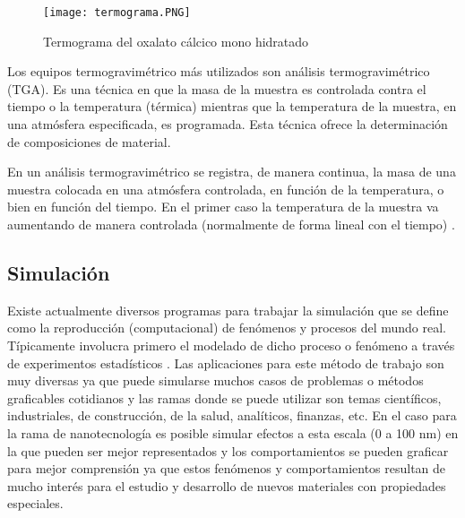 \documentclass[3pt,twocolumn]{elsarticle}
\begin{document}
\begin{figure}[H]
  \centering      
  \texttt{[image: termograma.PNG]}
  \caption{Termograma del oxalato cálcico mono hidratado \cite{book1}}
  \label{f1}
\end{figure}
\bigskip

Los equipos termogravimétrico más utilizados son análisis termogravimétrico (TGA). Es una técnica en que la masa de la muestra es controlada contra el tiempo o la temperatura (térmica) mientras que la temperatura de la muestra, en una atmósfera especificada, es programada. Esta técnica ofrece la determinación de composiciones de material. 

En un análisis termogravimétrico se registra, de manera continua, la masa de una muestra colocada en una atmósfera controlada, en función de la temperatura, o bien en función del tiempo. En el primer caso la temperatura de la muestra va aumentando de manera controlada (normalmente de forma lineal con el tiempo) \cite{book1}.

\subsection{Simulación}
Existe actualmente diversos programas para trabajar la simulación que se define como la reproducción (computacional) de fenómenos y procesos del mundo real. Típicamente involucra primero el modelado de dicho proceso o fenómeno a través de experimentos estadísticos \cite{dra}. Las aplicaciones para este método de trabajo son muy diversas ya que puede simularse muchos casos de problemas o métodos graficables cotidianos y las ramas donde se puede utilizar son temas científicos, industriales, de construcción, de la salud, analíticos, finanzas, etc. En el caso para la rama de nanotecnología es posible simular efectos a esta escala (0 a 100 nm) en la que pueden ser mejor representados y los comportamientos se pueden graficar para mejor comprensión ya que estos fenómenos y comportamientos resultan de mucho interés para el estudio y desarrollo de nuevos materiales con propiedades especiales. 
\end{document}

